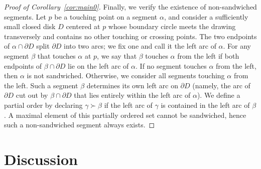 \documentclass[a4paper,UKenglish,cleveref, autoref, thm-restate]{lipics_arxiv}
\begin{document}
\begin{proof}[Proof of Corollary~\ref{cor:main0}]
Finally, we verify the existence of non-sandwiched segments. Let $p$ be a touching point on a segment $\alpha$, and consider a sufficiently small closed disk $D$ centered at $p$ whose boundary circle meets the drawing transversely and contains no other touching or crossing points. The two endpoints of $\alpha\cap \partial D$ split $\partial D$ into two arcs; we fix one and call it the left arc of $\alpha$. For any segment $\beta$ that touches $\alpha$ at $p$, we say that $\beta$ touches $\alpha$ from the left if both endpoints of $\beta\cap \partial D$ lie on the left arc of $\alpha$. If no segment touches $\alpha$ from the left, then $\alpha$ is not sandwiched. Otherwise, we consider all segments touching $\alpha$ from the left. Such a segment $\beta$ determines its own left arc on $\partial D$ (namely, the arc of $\partial D$ cut out by $\beta\cap \partial D$ that lies entirely within the left arc of $\alpha$). We define a partial order by declaring $\gamma \succ \beta$ if the left arc of $\gamma$ is contained in the left arc of $\beta$. A maximal element of this partially ordered set cannot be sandwiched, hence such a non-sandwiched segment always exists.
\end{proof}

\section{Discussion}\label{sec:discussion}
\end{document}
